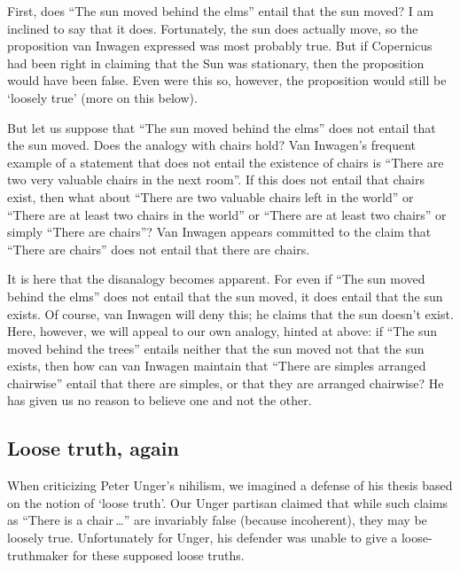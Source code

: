 \documentclass[11pt]{article}
\begin{document}
\begin{spacing}{1.5}
First, does ``The sun moved behind the elms'' entail that the sun moved? I am inclined to say that it does. Fortunately, the sun does actually move, so the proposition van Inwagen expressed was most probably true. But if Copernicus had been right in claiming that the Sun was stationary, then the proposition would have been false. Even were this so, however, the proposition would still be `loosely true' (more on this below).

But let us suppose that ``The sun moved behind the elms'' does not entail that the sun moved. Does the analogy with chairs hold? Van Inwagen's frequent example of a statement that does not entail the existence of chairs is ``There are two very valuable chairs in the next room''. If this does not entail that chairs exist, then what about ``There are two valuable chairs left in the world'' or ``There are at least two chairs in the world'' or ``There are at least two chairs'' or simply ``There are chairs''? Van Inwagen appears committed to the claim that ``There are chairs'' does not entail that there are chairs.

It is here that the disanalogy becomes apparent. For even if ``The sun moved behind the elms'' does not entail that the sun moved, it does entail that the sun exists. Of course, van Inwagen will deny this; he claims that the sun doesn't exist. Here, however, we will appeal to our own analogy, hinted at above: if ``The sun moved behind the trees'' entails neither that the sun moved not that the sun exists, then how can van Inwagen maintain that ``There are simples arranged chairwise'' entail that there are simples, or that they are arranged chairwise? He has given us no reason to believe one and not the other.

\subsection{Loose truth, again}
When criticizing Peter Unger's nihilism, we imagined a defense of his thesis based on the notion of `loose truth'. Our Unger partisan claimed that while such claims as ``There is a chair\,\ldots '' are invariably false (because incoherent), they may be loosely true. Unfortunately for Unger, his defender was unable to give a loose-truthmaker for these supposed loose truths.


\end{spacing}
\end{document}
